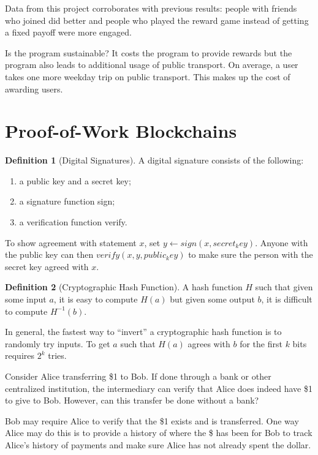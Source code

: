\documentclass[dvipsnames]{article}
\theoremstyle{definition}
\newtheorem{definition}{Definition}[section]
\theoremstyle{remark}
\begin{document}
Data from this project corroborates with previous results: people with friends who joined did better and people who played the reward game instead of getting a fixed payoff were more engaged.

Is the program sustainable? It costs the program to provide rewards but the program also leads to additional usage of public transport. On average, a user takes one more weekday trip on public transport. This makes up the cost of awarding users.

\newpage

\section{Proof-of-Work Blockchains}

\begin{definition}[Digital Signatures]
	A digital signature consists of the following:
	\begin{enumerate}
		\item a public key and a secret key;
		\item a signature function sign;
		\item a verification function verify.
	\end{enumerate}
	To show agreement with statement $x$, set $y \leftarrow sign(x,secret_key)$. Anyone with the public key can then $verify(x,y,public_key)$ to make sure the person with the secret key agreed with $x$.
\end{definition}

\begin{definition}[Cryptographic Hash Function]
	A hash function $H$ such that given some input $a$, it is easy to compute $H(a)$ but given some output $b$, it is difficult to compute $H^{-1}(b)$.
\end{definition}
In general, the fastest way to ``invert'' a cryptographic hash function is to randomly try inputs. To get $a$ such that $H(a)$ agrees with $b$ for the first $k$ bits requires $2^k$ tries. 

Consider Alice transferring \$1 to Bob. If done through a bank or other centralized institution, the intermediary can verify that Alice does indeed have \$1 to give to Bob. However, can this transfer be done without a bank?

Bob may require Alice to verify that the \$1 exists and is transferred. One way Alice may do this is to provide a history of where the \$ has been for Bob to track Alice's history of payments and make sure Alice has not already spent the dollar. 
\end{document}
